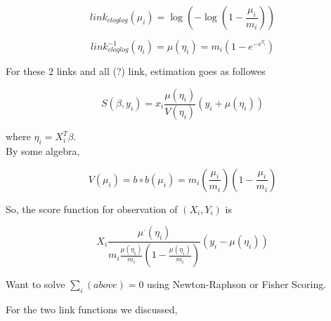 \documentclass[11pt,fleqn]{book} %
\begin{document}
		$$link_{cloglog} (\mu_i) = \log( -\log(1 - \frac{\mu_i}{m_i})) $$

		$$link_{cloglog}^{-1}(\eta_i) =  \mu(\eta_i) = m_i (1 - e^{-e^{\eta_i}}) $$

For these 2 links and all (?) link, estimation goes as followes

		$$S(\beta, y_i) = x_i \frac{\mu(\eta_i)}{V(\eta_i)}(y_i + \mu(\eta_i)) $$

where $\eta_i = X_i^T \beta$.\\

By some algebra, 

		$$V(\mu_i) = b \circ b(\mu_i) = m_i (\frac{\mu_i}{m_i})(1 - \frac{\mu_i}{m_i}) $$

So, the score function for observation of $(X_i, Y_i)$ is

		$$ X_i \frac{\mu^\cdot(\eta_i)}{m_i \frac{\mu(\eta_i)}{m_i} (1 - \frac{\mu(\eta_i)}{m_i})} (y_i - \mu(\eta_i)) $$

Want to solve $\sum_i (above) = 0$ using Newton-Raphson or Fisher Scoring. 

For the two link functions we discussed, 

		$$ $$







\end{document}
